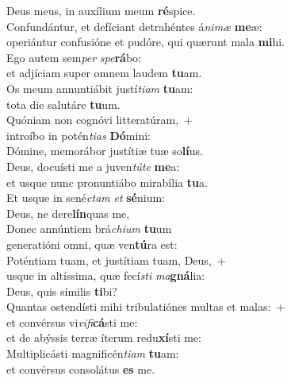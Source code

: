 \oddverse Deus meus, in auxílium meum \textbf{ré}spice.\\
\evenverse Confundántur, et defíciant detrahéntes á\textit{ni}\textit{mæ} \textbf{me}æ:~\*\\
\evenverse operiántur confusióne et pudóre, qui quærunt mala \textbf{mi}hi.\\
\oddverse Ego autem sem\textit{per} \textit{spe}\textbf{rá}bo:~\*\\
\oddverse et adjíciam super omnem laudem \textbf{tu}am.\\
\evenverse Os meum annuntiábit justí\textit{ti}\textit{am} \textbf{tu}am:~\*\\
\evenverse tota die salutáre \textbf{tu}um.\\
\oddverse Quóniam non cognóvi litteratúram,~+\\
\oddverse  introíbo in potén\textit{ti}\textit{as} \textbf{Dó}mini:~\*\\
\oddverse Dómine, memorábor justítiæ tuæ so\textbf{lí}us.\\
\evenverse Deus, docuísti me a juven\textit{tú}\textit{te} \textbf{me}a:~\*\\
\evenverse et usque nunc pronuntiábo mirabília \textbf{tu}a.\\
\oddverse Et usque in sené\textit{ctam} \textit{et} \textbf{sé}nium:~\*\\
\oddverse Deus, ne dere\textbf{lín}quas me,\\
\evenverse Donec annúntiem brá\textit{chi}\textit{um} \textbf{tu}um~\*\\
\evenverse generatióni omni, quæ ven\textbf{tú}ra est:\\
\oddverse Poténtiam tuam, et justítiam tuam, Deus,~+\\
\oddverse  usque in altíssima, quæ fecí\textit{sti} \textit{ma}\textbf{gná}lia:~\*\\
\oddverse Deus, quis símilis \textbf{ti}bi?\\
\evenverse Quantas ostendísti mihi tribulatiónes multas et malas:~+\\
\evenverse  et convérsus vi\textit{vi}\textit{fi}\textbf{cá}sti me:~\*\\
\evenverse et de abýssis terræ íterum redu\textbf{xí}sti me:\\
\oddverse Multiplicásti magnificén\textit{ti}\textit{am} \textbf{tu}am:~\*\\
\oddverse et convérsus consolátus \textbf{es} me.\\

